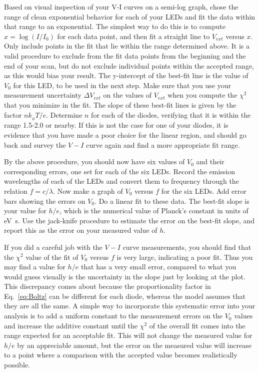 \documentclass{revtex4}
\begin{document}
Based on visual inspection of your V-I curves on a semi-log graph, chose
the range of clean exponential behavior for each of your LEDs and fit the
data within that range to an exponential.  The simplest way to do this is
to compute $x=\log(I/I_0)$ for each data point, and then fit a straight line
to $V_{ext}$ versus $x$.  Only include points in the fit that lie within the
range determined above.  It is a valid procedure to exclude from the fit
data points from the beginning and the end of your scan, but do not exclude
individual points within the accepted range, as this would bias your result.
The y-intercept of the best-fit line is the value of $V_0$
for this LED, to be used in the next step.  Make sure that you use your
measurement uncertainty $\Delta V_{ext}$ on the values of $V_{ext}$ when
you compute the $\chi^2$ that you minimize in the fit.  The slope of these
best-fit lines is given by the factor $nk_{_B}T/e$.  Determine $n$ for each
of the diodes, verifying that it is within the range 1.5-2.0 or nearby.
If this is not the case for one of your diodes, it is evidence that you
have made a poor choice for the linear region, and should go back and
survey the $V-I$ curve again and find a more appropriate fit range.

By the above procedure, you should now have six values of $V_0$ and their
corresponding errors, one set for each of the six LEDs.  Record the emission
wavelengths of each of the LEDs and convert them to frequency through the
relation $f=c/\lambda$.  Now make a graph of $V_0$ versus $f$ for the six
LEDs.  Add error bars showing the errors on $V_0$.  Do a linear fit to these
data.  The best-fit slope is your value for $h/e$, which is the numerical
value of Planck's constant in units of eV~s.  Use the jack-knife procedure
to estimate the error on the best-fit slope, and report this as the error
on your measured value of $h$.

If you did a careful job with the $V-I$ curve measurements, you should
find that the $\chi^2$ value of the fit of $V_0$ versus $f$ is very large,
indicating a poor fit.  Thus you may find a value for $h/e$ that has a 
very small error, compared to what you would guess visually is the uncertainty
in the slope just by looking at the plot.  This discrepancy comes about
because the proportionality factor in Eq.~\ref{eq:Boltz} can be different
for each diode, whereas the model assumes that they are all the same.
A simple way to incorporate this systematic error into your analysis is
to add a uniform constant to the measurement errors on the $V_0$ values and
increase the additive constant until the $\chi^2$ of the overall fit comes
into the range expected for an acceptable fit.  This will not change the
measured value for $h/e$ by an appreciable amount, but the error on the
measured value will increase to a point where a comparison with the
accepted value becomes realistically possible.
\end{document}
